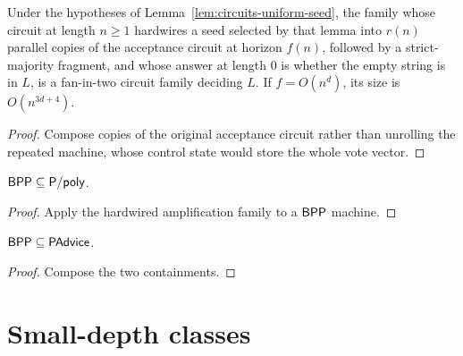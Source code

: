 \begin{theorem}
  \label{thm:circuits-hardwired-amplification}
  \leanok
  Under the hypotheses of Lemma~\ref{lem:circuits-uniform-seed}, the family
  whose circuit at length $n \ge 1$ hardwires a seed selected by that lemma
  into $r(n)$ parallel copies of the acceptance circuit at horizon $f(n)$,
  followed by a strict-majority fragment, and whose answer at length $0$ is
  whether the empty string is in $L$, is a fan-in-two circuit family deciding
  $L$. If $f = O(n^d)$, its size is $O(n^{3d+4})$.
\end{theorem}
\begin{proof}
  \leanok
  Compose copies of the original acceptance circuit rather than unrolling the
  repeated machine, whose control state would store the whole vote vector.
\end{proof}

\begin{theorem}[Adleman]
  \label{thm:circuits-bpp-subset-ppoly}
  \leanok
  $\mathsf{BPP} \subseteq \mathsf{P/poly}$.
\end{theorem}
\begin{proof}
  \leanok
  Apply the hardwired amplification family to a $\mathsf{BPP}$ machine.
\end{proof}

\begin{corollary}
  \label{cor:circuits-bpp-subset-padvice}
  \leanok
  $\mathsf{BPP} \subseteq \mathsf{PAdvice}$.
\end{corollary}
\begin{proof}
  \leanok
  Compose the two containments.
\end{proof}

\section{Small-depth classes}
\label{sec:circuits-depth}

